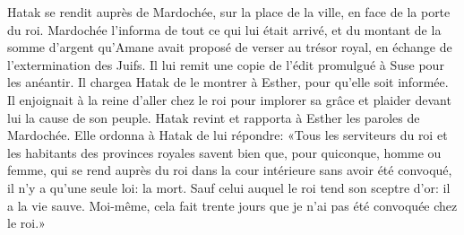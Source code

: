 Hatak se rendit auprès de Mardochée, sur la place de la ville, en face de la porte du roi.
Mardochée l’informa de tout ce qui lui était arrivé,
	et du montant de la somme d’argent qu’Amane avait proposé de verser au trésor royal,
	en échange de l’extermination des Juifs.
Il lui remit une copie de l’édit promulgué à Suse pour les anéantir.
	Il chargea Hatak de le montrer à Esther, pour qu’elle soit informée.
Il enjoignait à la reine d’aller chez le roi pour implorer sa grâce
	et plaider devant lui la cause de son peuple.
Hatak revint et rapporta à Esther les paroles de Mardochée.
Elle ordonna à Hatak de lui répondre:
	«Tous les serviteurs du roi et les habitants des provinces royales savent bien
	que, pour quiconque, homme ou femme,
		qui se rend auprès du roi dans la cour intérieure sans avoir été convoqué,
	il n’y a qu’une seule loi: la mort.
Sauf celui auquel le roi tend son sceptre d’or:
	il a la vie sauve.
Moi-même, cela fait trente jours que je n’ai pas été convoquée chez le roi.»

